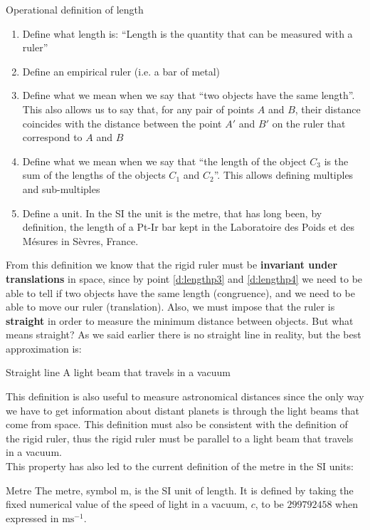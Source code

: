 \begin{definition}{Operational definition of length}
  \begin{enumerate}
    \item Define what length is: ``Length is the quantity that can be measured with a ruler''
    \item Define an empirical ruler (i.e. a bar of metal)
    \item Define what we mean when we say that ``two objects have the same length''. This also allows us to say that, for any pair of points $A$ and $B$, their distance coincides with the distance between the point $A'$ and $B'$ on the ruler that correspond to $A$ and $B$ \label{d:lengthp3}
    \item Define what we mean when we say that ``the length of the object $C_3$ is the sum of the lengths of the objects $C_1$ and $C_2$''. This allows defining multiples and sub-multiples \label{d:lengthp4}
    \item Define a unit. In the SI the unit is the metre, that has long been, by definition, the length of a Pt-Ir bar kept in the Laboratoire des Poids et des Mésures in Sèvres, France.
  \end{enumerate}
\end{definition}
From this definition we know that the rigid ruler must be \textbf{invariant under translations} in space, since by point \eqref{d:lengthp3} and \eqref{d:lengthp4} we need to be able to tell if two objects have the same length (congruence), and we need to be able to move our ruler (translation). Also, we must impose that the ruler is \textbf{straight} in order to measure the minimum distance between objects. But what means straight? As we said earlier there is no straight line in reality, but the best approximation is:
\begin{definition}{Straight line}
  A light beam that travels in a vacuum
\end{definition}
This definition is also useful to measure astronomical distances since the only way we have to get information about distant planets is through the light beams that come from space. This definition must also be consistent with the definition of the rigid ruler, thus the rigid ruler must be parallel to a light beam that travels in a vacuum.\\
This property has also led to the current definition of the metre in the SI units:
\begin{definition}{Metre}
  The metre, symbol m, is the SI unit of length. It is defined by taking the fixed numerical value of the speed of light in a vacuum, $c$, to be $299792458$ when expressed in $\unit{\metre \second^{-1}}$.
\end{definition}
